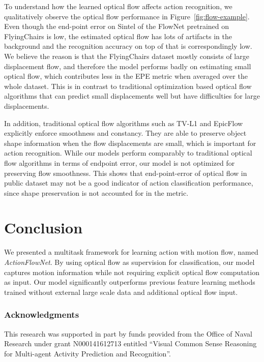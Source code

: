 \documentclass[10pt,twocolumn,letterpaper]{article}
\begin{document}
To understand how the learned optical flow affects action recognition, we qualitatively observe the optical flow performance in Figure~\ref{fig:flow-example}.
Even though the end-point error on Sintel of the FlowNet pretrained on FlyingChairs is low, the estimated optical flow has lots of artifacts in the background and the recognition accuracy on top of that is correspondingly low.
We believe the reason is that the FlyingChairs dataset mostly consists of large displacement flow, and therefore the model performs badly on estimating small optical flow, which contributes less in the EPE metric when averaged over the whole dataset.
This is in contrast to traditional optimization based optical flow algorithms that can predict small displacements well but have difficulties for large displacements.


In addition, traditional optical flow algorithms such as TV-L1 and EpicFlow explicitly enforce smoothness and constancy. They are able to preserve object shape information when the flow displacements are small, which is important for action recognition.
While our models perform comparably to traditional optical flow algorithms in terms of endpoint error, our model is not optimized for preserving flow smoothness. 
This shows that end-point-error of optical flow in public dataset may not be a good indicator of action classification performance, since shape preservation is not accounted for in the metric.











 

\vspace{-.5em}
\section{Conclusion}
\vspace{-.5em}
\label{sec:conclusion}

We presented a multitask framework for learning action with motion flow, named \emph{ActionFlowNet}. 
By using optical flow as supervision for classification, our model captures motion information while not requiring explicit optical flow computation as input.
Our model significantly outperforms previous feature learning methods trained without external large scale data and additional optical flow input.
 
\subsubsection*{Acknowledgments}
This research was supported in part by funds provided from
the Office of Naval Research under grant N000141612713
entitled ``Visual Common Sense Reasoning for Multi-agent
Activity Prediction and Recognition''.
 
{\small


}
\end{document}
